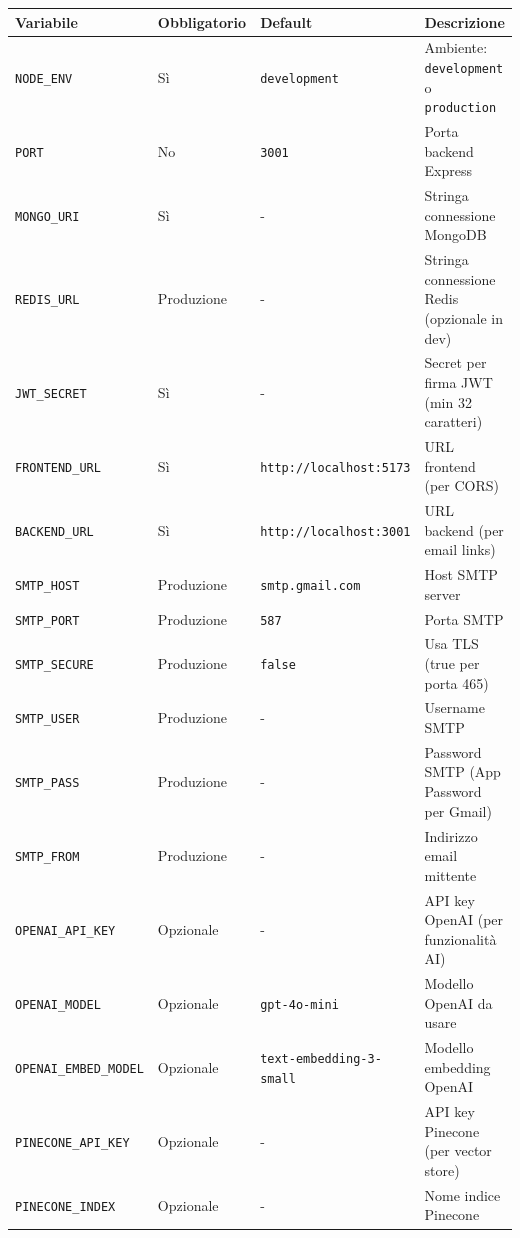 \documentclass[11pt,a4paper]{article}
\newcommand{\code}[1]{\texttt{#1}}
\begin{document}
\begin{longtable}{|p{4cm}|p{3cm}|p{2cm}|p{6cm}|}
\hline
\textbf{Variabile} & \textbf{Obbligatorio} & \textbf{Default} & \textbf{Descrizione} \\
\hline
\endhead

\code{NODE\_ENV} & Sì & \code{development} & Ambiente: \code{development} o \code{production} \\
\hline

\code{PORT} & No & \code{3001} & Porta backend Express \\
\hline

\code{MONGO\_URI} & Sì & - & Stringa connessione MongoDB \\
\hline

\code{REDIS\_URL} & Produzione & - & Stringa connessione Redis (opzionale in dev) \\
\hline

\code{JWT\_SECRET} & Sì & - & Secret per firma JWT (min 32 caratteri) \\
\hline

\code{FRONTEND\_URL} & Sì & \code{http://localhost:5173} & URL frontend (per CORS) \\
\hline

\code{BACKEND\_URL} & Sì & \code{http://localhost:3001} & URL backend (per email links) \\
\hline

\code{SMTP\_HOST} & Produzione & \code{smtp.gmail.com} & Host SMTP server \\
\hline

\code{SMTP\_PORT} & Produzione & \code{587} & Porta SMTP \\
\hline

\code{SMTP\_SECURE} & Produzione & \code{false} & Usa TLS (true per porta 465) \\
\hline

\code{SMTP\_USER} & Produzione & - & Username SMTP \\
\hline

\code{SMTP\_PASS} & Produzione & - & Password SMTP (App Password per Gmail) \\
\hline

\code{SMTP\_FROM} & Produzione & - & Indirizzo email mittente \\
\hline

\code{OPENAI\_API\_KEY} & Opzionale & - & API key OpenAI (per funzionalità AI) \\
\hline

\code{OPENAI\_MODEL} & Opzionale & \code{gpt-4o-mini} & Modello OpenAI da usare \\
\hline

\code{OPENAI\_EMBED\_MODEL} & Opzionale & \code{text-embedding-3-small} & Modello embedding OpenAI \\
\hline

\code{PINECONE\_API\_KEY} & Opzionale & - & API key Pinecone (per vector store) \\
\hline

\code{PINECONE\_INDEX} & Opzionale & - & Nome indice Pinecone \\
\hline

\end{longtable}
\end{document}
